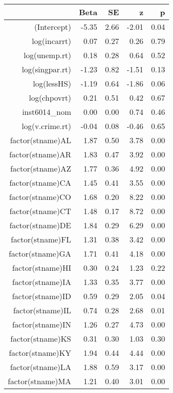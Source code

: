 \begin{table}[ht]
\centering
\begin{tabular}{rrrrr}
  \hline
 & Beta & SE & z & p \\ 
  \hline
(Intercept) & -5.35 & 2.66 & -2.01 & 0.04 \\ 
  log(incarrt) & 0.07 & 0.27 & 0.26 & 0.79 \\ 
  log(unemp.rt) & 0.18 & 0.28 & 0.64 & 0.52 \\ 
  log(singpar.rt) & -1.23 & 0.82 & -1.51 & 0.13 \\ 
  log(lessHS) & -1.19 & 0.64 & -1.86 & 0.06 \\ 
  log(chpovrt) & 0.21 & 0.51 & 0.42 & 0.67 \\ 
  inst6014\_nom & 0.00 & 0.00 & 0.74 & 0.46 \\ 
  log(v.crime.rt) & -0.04 & 0.08 & -0.46 & 0.65 \\ 
  factor(stname)AL & 1.87 & 0.50 & 3.78 & 0.00 \\ 
  factor(stname)AR & 1.83 & 0.47 & 3.92 & 0.00 \\ 
  factor(stname)AZ & 1.77 & 0.36 & 4.92 & 0.00 \\ 
  factor(stname)CA & 1.45 & 0.41 & 3.55 & 0.00 \\ 
  factor(stname)CO & 1.68 & 0.20 & 8.22 & 0.00 \\ 
  factor(stname)CT & 1.48 & 0.17 & 8.72 & 0.00 \\ 
  factor(stname)DE & 1.84 & 0.29 & 6.29 & 0.00 \\ 
  factor(stname)FL & 1.31 & 0.38 & 3.42 & 0.00 \\ 
  factor(stname)GA & 1.71 & 0.41 & 4.18 & 0.00 \\ 
  factor(stname)HI & 0.30 & 0.24 & 1.23 & 0.22 \\ 
  factor(stname)IA & 1.33 & 0.35 & 3.77 & 0.00 \\ 
  factor(stname)ID & 0.59 & 0.29 & 2.05 & 0.04 \\ 
  factor(stname)IL & 0.74 & 0.28 & 2.68 & 0.01 \\ 
  factor(stname)IN & 1.26 & 0.27 & 4.73 & 0.00 \\ 
  factor(stname)KS & 0.31 & 0.30 & 1.03 & 0.30 \\ 
  factor(stname)KY & 1.94 & 0.44 & 4.44 & 0.00 \\ 
  factor(stname)LA & 1.88 & 0.59 & 3.17 & 0.00 \\ 
  factor(stname)MA & 1.21 & 0.40 & 3.01 & 0.00 \\ 

\end{tabular}
\end{table}
